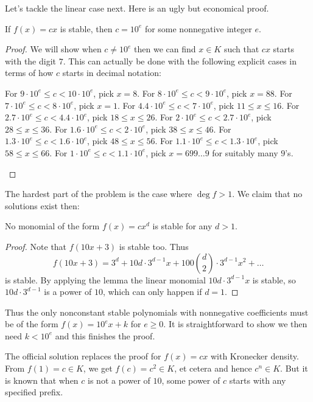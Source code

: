 \documentclass[11pt]{scrartcl}
\begin{document}
Let's tackle the linear case next.
Here is an ugly but economical proof.
\begin{claim*}
  If $f(x) = cx$ is stable, then $c = 10^e$
  for some nonnegative integer $e$.
\end{claim*}
\begin{proof}
  We will show when $c \neq 10^e$ then we can find $x \in K$
  such that $cx$ starts with the digit $7$.
  This can actually be done with the following explicit cases
  in terms of how $c$ starts in decimal notation:
  \begin{itemize}
    \ii For $9 \cdot 10^e \le c < 10 \cdot 10^e$, pick $x = 8$.
    \ii For $8 \cdot 10^e \le c < 9 \cdot 10^e$, pick $x = 88$.
    \ii For $7 \cdot 10^e \le c < 8 \cdot 10^e$, pick $x = 1$.
    \ii For $4.4 \cdot 10^e \le c < 7 \cdot 10^e$, pick $11 \le x \le 16$.
    \ii For $2.7 \cdot 10^e \le c < 4.4 \cdot 10^e$, pick $18 \le x \le 26$.
    \ii For $2 \cdot 10^e \le c < 2.7 \cdot 10^e$, pick $28 \le x \le 36$.
    \ii For $1.6 \cdot 10^e \le c < 2 \cdot 10^e$, pick $38 \le x \le 46$.
    \ii For $1.3 \cdot 10^e \le c < 1.6 \cdot 10^e$, pick $48 \le x \le 56$.
    \ii For $1.1 \cdot 10^e \le c < 1.3 \cdot 10^e$, pick $58 \le x \le 66$.
    \ii For $1 \cdot 10^e \le c < 1.1 \cdot 10^e$, pick $x = 699\dots9$
    for suitably many $9$'s. \qedhere
  \end{itemize}
\end{proof}

The hardest part of the problem is the case where $\deg f > 1$.
We claim that no solutions exist then:
\begin{claim*}
  No monomial of the form $f(x) = cx^d$ is stable
  for any $d > 1$.
\end{claim*}
\begin{proof}
  Note that $f(10x+3)$ is stable too.
  Thus
  \[ f(10x+3) = 3^d + 10d \cdot 3^{d-1} x
    + 100 \binom d2 \cdot 3^{d-1} x^2 + \dots \]
  is stable.
  By applying the lemma the linear monomial
  $10d \cdot 3^{d-1} x$ is stable,
  so $10d \cdot 3^{d-1}$ is a power of $10$,
  which can only happen if $d = 1$.
\end{proof}

Thus the only nonconstant stable polynomials with nonnegative coefficients
must be of the form $f(x) = 10^e x + k$ for $e \ge 0$.
It is straightforward to show we then need $k < 10^e$
and this finishes the proof.

\begin{remark*}
  The official solution replaces the proof
  for $f(x) = cx$ with Kronecker density.
  From $f(1) = c \in K$, we get $f(c) = c^2 \in K$,
  et cetera and hence $c^n \in K$.
  But it is known that when $c$ is not a power of $10$,
  some power of $c$ starts with any specified prefix.
\end{remark*}
\pagebreak
\end{document}
